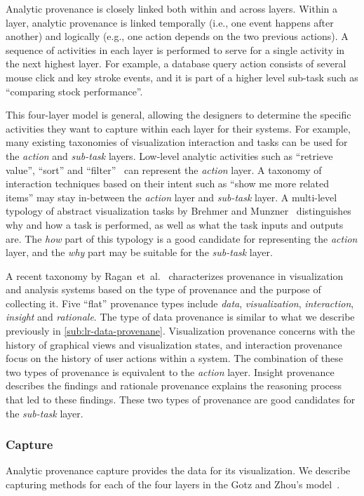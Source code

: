 Analytic provenance is closely linked both within and across layers. Within a layer, analytic provenance is linked temporally (i.e., one event happens after another) and logically (e.g., one action depends on the two previous actions). A sequence of activities in each layer is performed to serve for a single activity in the next highest layer. For example, a database query action consists of several mouse click and key stroke events, and it is part of a higher level sub-task such as ``comparing stock performance''.

This four-layer model is general, allowing the designers to determine the specific activities they want to capture within each layer for their systems. For example, many existing taxonomies of visualization interaction and tasks can be used for the \emph{action} and \emph{sub-task} layers. Low-level analytic activities such as ``retrieve value'', ``sort'' and ``filter''~\cite{Amar2005, Gotz2009} can represent the \emph{action} layer. A taxonomy of interaction techniques based on their intent such as ``show me more related items'' may stay in-between the \emph{action} layer and \emph{sub-task} layer. A multi-level typology of abstract visualization tasks by Brehmer and Munzner~\cite{Brehmer2013} distinguishes why and how a task is performed, as well as what the task inputs and outputs are. The \emph{how} part of this typology is a good candidate for representing the \emph{action} layer, and the \emph{why} part may be suitable for the \emph{sub-task} layer.

A recent taxonomy by Ragan~et~al.~\cite{Ragan2016} characterizes provenance in visualization and analysis systems based on the type of provenance and the purpose of collecting it. Five ``flat'' provenance types include \emph{data}, \emph{visualization}, \emph{interaction}, \emph{insight} and \emph{rationale}. The type of data provenance is similar to what we describe previously in \autoref{sub:lr-data-provenane}. Visualization provenance concerns with the history of graphical views and visualization states, and interaction provenance focus on the history of user actions within a system. The combination of these two types of provenance is equivalent to the \emph{action} layer. Insight provenance describes the findings and rationale provenance explains the reasoning process that led to these findings. These two types of provenance are good candidates for the \emph{sub-task} layer.

\subsubsection{Capture}
Analytic provenance capture provides the data for its visualization. We describe capturing methods for each of the four layers in the Gotz and Zhou's model~\cite{Gotz2009}.


